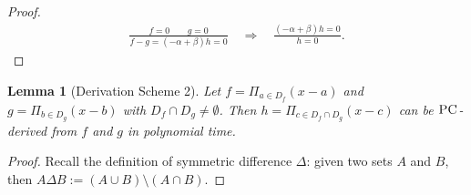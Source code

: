 \documentclass[11pt]{article}
\newcommand{\PC}{\textsc{PC}}
\newcommand{\1}{\textbf{1}}
\newtheorem{lemma}[theorem]{Lemma}
\begin{document}
\begin{proof}
    \begin{align*}
        \frac{f=0 \qquad g=0}{f-g = (-\alpha + \beta) h =0} \quad \Rightarrow \quad \frac{(-\alpha + \beta)h = 0}{h = 0}.
    \end{align*}
\end{proof}

\begin{lemma}[Derivation Scheme 2]\label{th:derivation_scheme_2}
    Let $f = \Pi_{a \in D_f} (x-a)$ and $g = \Pi_{b \in D_g}(x-b)$ with $D_f \cap D_g \neq \emptyset$. Then $h = \Pi_{c \in D_f \cap D_g}(x-c)$ can be $\PC$-derived from $f$ and $g$ in polynomial time.
\end{lemma}

\begin{proof}
    Recall the definition of symmetric difference $\Delta$: given two sets $A$ and $B$, then $A \Delta B := (A \cup B) \setminus (A \cap B)$.


\end{proof}
\end{document}
